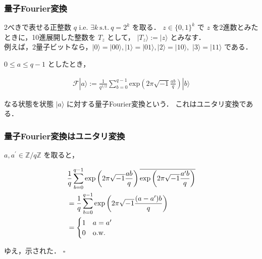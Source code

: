 \documentclass[dvipdfmx,12pt]{beamer}
\begin{document}
\begin{frame}

\frametitle{量子Fourier変換}

2べきで表せる正整数 $ q $ i.e. $ \exists k \ \mathrm{s.t.} \ q = 2^k $ を取る．
$ z \in \{ 0, 1 \}^k $ で $z$ を2進数とみたときに，10進展開した整数を $ T_z $ として，
$ | T_z \rangle := | z \rangle $ とみなす． \\
例えば，2量子ビットなら，$ | 0 \rangle = | 00 \rangle, | 1 \rangle = | 01 \rangle, | 2 \rangle = | 10 \rangle, $ $ | 3 \rangle = | 11 \rangle $ である． \\

\vspace{10pt}

$ 0 \leq a \leq q - 1 $ としたとき，\vspace{-25pt}

\begin{align*}
    \displaystyle \mathscr{F} | a \rangle := \frac{1}{q^{1/2}} \sum_{b = 0}^{q - 1} \mathrm{exp} \left( 2 \pi \sqrt{-1} \frac{ab}{q} \right) | b \rangle
\end{align*}

なる状態を状態 $ | a \rangle $ に対する量子Fourier変換という．
これはユニタリ変換である．

\end{frame}


\begin{frame}

\frametitle{量子Fourier変換はユニタリ変換}

$ a, a^{\prime} \in \mathbb{Z} / q \mathbb{Z} $ を取ると，\vspace{-25pt}

\begin{align*}
    \displaystyle & \frac{1}{q} \sum_{b = 0}^{q - 1} \mathrm{exp} \left( 2 \pi \sqrt{-1} \frac{ab}{q} \right) \overline{\mathrm{exp} \left( 2 \pi \sqrt{-1} \frac{a^{\prime}b}{q} \right)} \\
    \displaystyle & = \frac{1}{q} \sum_{b = 0}^{q - 1} \mathrm{exp} \left( 2 \pi \sqrt{-1} \frac{(a - a^{\prime} )b}{q} \right) \\
    \displaystyle & = \begin{cases} 1 \hspace{10pt} a = a^{\prime} \\ 0 \hspace{10pt} \mathrm{o.w.} \end{cases}
\end{align*}

ゆえ，示された． \hspace{\fill} $ \square $

\end{frame}
\end{document}
